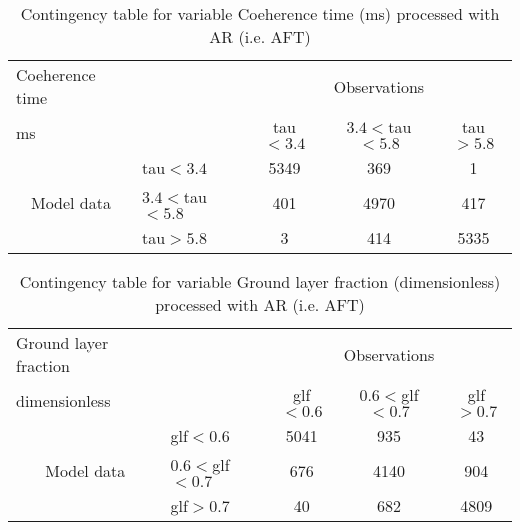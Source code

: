 \documentclass[11pt,english]{article}
\begin{document}
\begin{table}[]
\begin{center}
\begin{tabular}{llccc}
\hline
{Coeherence time}                                       &                                                    & \multicolumn{3}{c}{Observations}                 \\
{ms}                                       &                             & tau$<3.4$   & $3.4<$tau$<5.8$ & tau$>5.8$ \\
\hline
\multicolumn{1}{c}{\multirow{3}{*}{Model data}}  & tau$<3.4$          & 5349                & 369                       & 1              \\
                                                 & $3.4<$tau$<5.8$ & 401                & 4970                       & 417              \\
                                                 & tau$>5.8$          & 3                & 414                       & 5335              \\
\hline
\end{tabular}
\end{center}
\caption{Contingency table for variable Coeherence time (ms) processed with AR (i.e. AFT)}
\label{tab:contingency}
\end{table}

\begin{table}[]
\begin{center}
\begin{tabular}{llccc}
\hline
{Ground layer fraction}                                       &                                                    & \multicolumn{3}{c}{Observations}                 \\
{dimensionless}                                       &                             & glf$<0.6$   & $0.6<$glf$<0.7$ & glf$>0.7$ \\
\hline
\multicolumn{1}{c}{\multirow{3}{*}{Model data}}  & glf$<0.6$          & 5041                & 935                       & 43              \\
                                                 & $0.6<$glf$<0.7$ & 676                & 4140                       & 904              \\
                                                 & glf$>0.7$          & 40                & 682                       & 4809              \\
\hline
\end{tabular}
\end{center}
\caption{Contingency table for variable Ground layer fraction (dimensionless) processed with AR (i.e. AFT)}
\label{tab:contingency}
\end{table}
\clearpage
\end{document}
